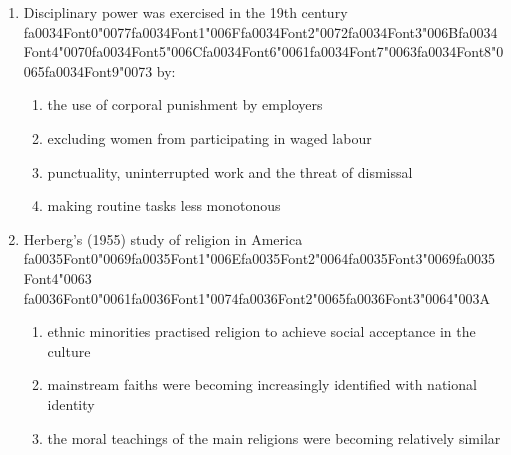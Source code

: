 \documentclass[12pt]{article}
\begin{document}
\begin{enumerate}[label=\arabic*.]
\begin{enumerate}[label=(\alph*)]
    \item embrace conventional cultural values but offer new means of achieving them
    \item react against the loss of any meaningful religious content in the teachings of churches
    \item adopt an attitude of mild disapproval towards mainstream social values
    \item reject both the goals and means of conventional society and provide utopian alternatives
\end{enumerate}
\item Disciplinary power was exercised in the 19th century {\csname fa0034Font0\endcsname\char"0077}{\csname fa0034Font1\endcsname\char"006F}{\csname fa0034Font2\endcsname\char"0072}{\csname fa0034Font3\endcsname\char"006B}{\csname fa0034Font4\endcsname\char"0070}{\csname fa0034Font5\endcsname\char"006C}{\csname fa0034Font6\endcsname\char"0061}{\csname fa0034Font7\endcsname\char"0063}{\csname fa0034Font8\endcsname\char"0065}{\csname fa0034Font9\endcsname\char"0073} by:
\begin{enumerate}[label=(\alph*)]
    \item the use of corporal punishment by employers
    \item excluding women from participating in waged labour
    \item punctuality, uninterrupted work and the threat of dismissal
    \item making routine tasks less monotonous
\end{enumerate}
\item Herberg's (1955) study of religion in America {\csname fa0035Font0\endcsname\char"0069}{\csname fa0035Font1\endcsname\char"006E}{\csname fa0035Font2\endcsname\char"0064}{\csname fa0035Font3\endcsname\char"0069}{\csname fa0035Font4\endcsname\char"0063} {\csname fa0036Font0\endcsname\char"0061}{\csname fa0036Font1\endcsname\char"0074}{\csname fa0036Font2\endcsname\char"0065}{\csname fa0036Font3\endcsname\char"0064}{\char"003A}
\begin{enumerate}[label=(\alph*)]
    \item ethnic minorities practised religion to achieve social acceptance in the culture
    \item mainstream faiths were becoming increasingly identified with national identity
    \item the moral teachings of the main religions were becoming relatively similar

\end{enumerate}
\end{enumerate}
\end{document}
